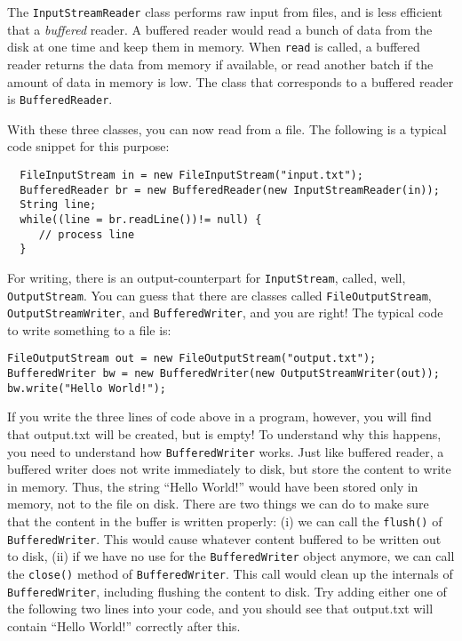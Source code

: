 \documentclass[a4paper,11pt]{exam}
\begin{document}
The \texttt{InputStreamReader} class performs raw input from files, and is less efficient that a \textit{buffered} reader.  A buffered reader would read a bunch of data from the disk at one time and keep them in memory.  When \texttt{read} is called, a buffered reader returns the data from memory if available, or read another batch if the amount of data in memory is low.  The class that corresponds to a buffered reader is \texttt{BufferedReader}.

With these three classes, you can now read from a file.  The following is a typical code snippet for this purpose:
\begin{verbatim}
  FileInputStream in = new FileInputStream("input.txt");
  BufferedReader br = new BufferedReader(new InputStreamReader(in));
  String line;
  while((line = br.readLine())!= null) {
     // process line
  }
\end{verbatim}

For writing, there is an output-counterpart for \texttt{InputStream}, called, well, \texttt{OutputStream}.  You can guess that there are classes called \texttt{FileOutputStream}, \texttt{OutputStreamWriter}, and \texttt{BufferedWriter}, and you are right!  The typical code to write something to a file is:
\begin{verbatim}
FileOutputStream out = new FileOutputStream("output.txt");
BufferedWriter bw = new BufferedWriter(new OutputStreamWriter(out));
bw.write("Hello World!");
\end{verbatim}

If you write the three lines of code above in a program, however, you will find that output.txt will be created, but is empty!  To understand why this happens, you need to understand how \texttt{BufferedWriter} works.  Just like buffered reader, a buffered writer does not write immediately to disk, but store the content to write in memory.  Thus, the string ``Hello World!'' would have been stored only in memory, not to the file on disk.  There are two things we can do to make sure that the content in the buffer is written properly: (i) we can call the \texttt{flush()} of \texttt{BufferedWriter}.  This would cause whatever content buffered to be written out to disk, (ii) if we have no use for the \texttt{BufferedWriter} object anymore, we can call the \texttt{close()} method of \texttt{BufferedWriter}.  This call would clean up the internals of \texttt{BufferedWriter}, including flushing the content to disk.  Try adding either one of the following two lines into your code, and you should see that output.txt will contain ``Hello World!'' correctly after this.
\end{document}
